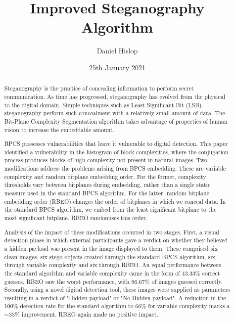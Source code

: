 \documentclass{l4proj}
\begin{document}
\title{Improved Steganography Algorithm}
\author{Daniel Hislop}
\date{25th January 2021}

\maketitle

\begin{abstract}
    Steganography is the practice of concealing information to perform secret communication. As time has progressed, steganography has evolved from the physical to the digital domain. Simple techniques such as Least Significant Bit (LSB) steganography perform such concealment with a relatively small amount of data. The Bit-Plane Complexity Segmentation algorithm takes advantage of properties of human vision to increase the embeddable amount. 

    BPCS possesses vulnerabilities that leave it vulnerable to digital detection. This paper identified a vulnerability in the histogram of block complexities, where the conjugation process produces blocks of high complexity not present in natural images. Two modifications address the problems arising from BPCS embedding. These are variable complexity and random bitplane embedding order. For the former, complexity thresholds vary between bitplanes during embedding, rather than a single static measure used in the standard BPCS algorithm. For the latter, random bitplane embedding order (RBEO) changes the order of bitplanes in which we conceal data. In the standard BPCS algorithm, we embed from the least significant bitplane to the most significant bitplane. RBEO randomises this order. 
    
    Analysis of the impact of these modifications occurred in two stages. First, a visual detection phase in which external participants gave a verdict on whether they believed a hidden payload was present in the image displayed to them. These comprised six clean images, six stego objects created through the standard BPCS algorithm, six through variable complexity and six through RBEO. An equal performance between the standard algorithm and variable complexity came in the form of 43.33\% correct guesses. RBEO saw the worst performance, with 96.67\% of images guessed correctly. Secondly, using a novel digital detection tool, these images were supplied as parameters resulting in a verdict of "Hidden payload" or "No Hidden payload". A reduction in the 100\% detection rate for the standard algorithm to 66\% for variable complexity marks a $\sim$33\% improvement. RBEO again made no positive impact.
    

\end{abstract}
\end{document}

